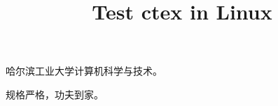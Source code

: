 \documentclass[adobefonts]{article}
\title{Test ctex in Linux}
\date{}
\author{ }
\begin{document}
\maketitle
哈尔滨工业大学计算机科学与技术。

规格严格，功夫到家。
\end{document}
